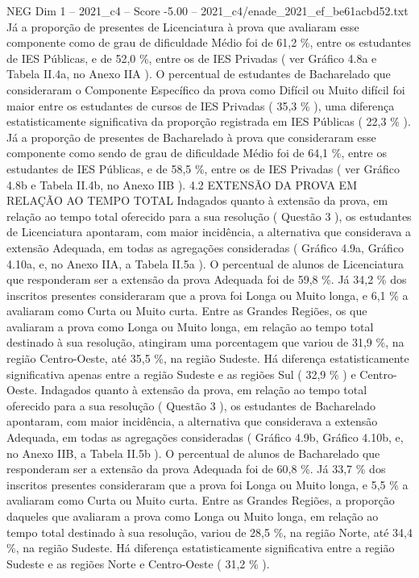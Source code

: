\begin{textsample}{NEG Dim 1 – 2021\_c4 – Score -5.00 – 2021\_c4/enade\_2021\_ef\_be61acbd52.txt}
Já a proporção de presentes de Licenciatura à prova que avaliaram esse componente como de grau de dificuldade Médio foi de 61,2 \%, entre os estudantes de IES Públicas, e de 52,0 \%, entre os de IES Privadas ( ver Gráfico 4.8a e Tabela II.4a, no Anexo IIA ).
O percentual de estudantes de Bacharelado que consideraram o Componente Específico da prova como Difícil ou Muito difícil foi maior entre os estudantes de cursos de IES Privadas ( 35,3 \% ), uma diferença estatisticamente significativa da proporção registrada em IES Públicas ( 22,3 \% ).
Já a proporção de presentes de Bacharelado à prova que consideraram esse componente como sendo de grau de dificuldade Médio foi de 64,1 \%, entre os estudantes de IES Públicas, e de 58,5 \%, entre os de IES Privadas ( ver Gráfico 4.8b e Tabela II.4b, no Anexo IIB ). 4.2 EXTENSÃO DA PROVA EM RELAÇÃO AO TEMPO TOTAL Indagados quanto à extensão da prova, em relação ao tempo total oferecido para a sua resolução ( Questão 3 ), os estudantes de Licenciatura apontaram, com maior incidência, a alternativa que considerava a extensão Adequada, em todas as agregações consideradas ( Gráfico 4.9a, Gráfico 4.10a, e, no Anexo IIA, a Tabela II.5a ).
O percentual de alunos de Licenciatura que responderam ser a extensão da prova Adequada foi de 59,8 \%.
Já 34,2 \% dos inscritos presentes consideraram que a prova foi Longa ou Muito longa, e 6,1 \% a avaliaram como Curta ou Muito curta.
Entre as Grandes Regiões, os que avaliaram a prova como Longa ou Muito longa, em relação ao tempo total destinado à sua resolução, atingiram uma porcentagem que variou de 31,9 \%, na região Centro-Oeste, até 35,5 \%, na região Sudeste.
Há diferença estatisticamente significativa apenas entre a região Sudeste e as regiões Sul ( 32,9 \% ) e Centro-Oeste.
Indagados quanto à extensão da prova, em relação ao tempo total oferecido para a sua resolução ( Questão 3 ), os estudantes de Bacharelado apontaram, com maior incidência, a alternativa que considerava a extensão Adequada, em todas as agregações consideradas ( Gráfico 4.9b, Gráfico 4.10b, e, no Anexo IIB, a Tabela II.5b ).
O percentual de alunos de Bacharelado que responderam ser a extensão da prova Adequada foi de 60,8 \%.
Já 33,7 \% dos inscritos presentes consideraram que a prova foi Longa ou Muito longa, e 5,5 \% a avaliaram como Curta ou Muito curta.
Entre as Grandes Regiões, a proporção daqueles que avaliaram a prova como Longa ou Muito longa, em relação ao tempo total destinado à sua resolução, variou de 28,5 \%, na região Norte, até 34,4 \%, na região Sudeste.
Há diferença estatisticamente significativa entre a região Sudeste e as regiões Norte e Centro-Oeste ( 31,2 \% ).

\end{textsample}
